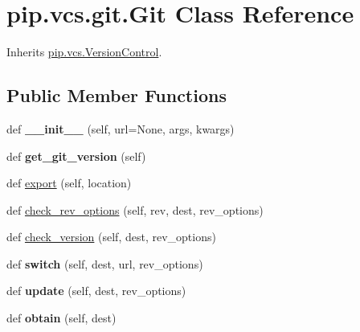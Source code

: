 \hypertarget{classpip_1_1vcs_1_1git_1_1_git}{}\section{pip.\+vcs.\+git.\+Git Class Reference}
\label{classpip_1_1vcs_1_1git_1_1_git}


Inherits \hyperlink{classpip_1_1vcs_1_1_version_control}{pip.\+vcs.\+Version\+Control}.

\subsection*{Public Member Functions}
\begin{DoxyCompactItemize}
\item 
\mbox{\label{classpip_1_1vcs_1_1git_1_1_git_a877dc4f7f36e782785f3ff43e7443ada}} 
def {\bfseries \+\_\+\+\_\+init\+\_\+\+\_\+} (self, url=None, args, kwargs)
\item 
\mbox{\label{classpip_1_1vcs_1_1git_1_1_git_a893127cecd38949beb8ea75df0a0c83f}} 
def {\bfseries get\+\_\+git\+\_\+version} (self)
\item 
def \hyperlink{classpip_1_1vcs_1_1git_1_1_git_ae58419806faec1e58516a3d253b63611}{export} (self, location)
\item 
def \hyperlink{classpip_1_1vcs_1_1git_1_1_git_a3dcf087bd4e3b6ec255bc8de709ba7bf}{check\+\_\+rev\+\_\+options} (self, rev, dest, rev\+\_\+options)
\item 
def \hyperlink{classpip_1_1vcs_1_1git_1_1_git_a46aa03992931441d49a275a4e15953c2}{check\+\_\+version} (self, dest, rev\+\_\+options)
\item 
\mbox{\label{classpip_1_1vcs_1_1git_1_1_git_ae86e1ddcf73078786a655753a7fc24a9}} 
def {\bfseries switch} (self, dest, url, rev\+\_\+options)
\item 
\mbox{\label{classpip_1_1vcs_1_1git_1_1_git_a362b2eb89024210e9154eda47d41b933}} 
def {\bfseries update} (self, dest, rev\+\_\+options)
\item 
\mbox{\label{classpip_1_1vcs_1_1git_1_1_git_a5ad287451ecb79d3501838e0aece4d19}} 
def {\bfseries obtain} (self, dest)

\end{DoxyCompactItemize}
